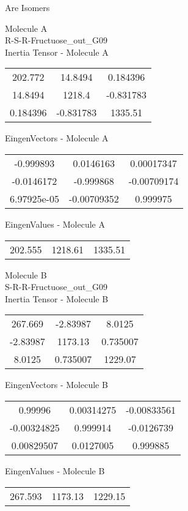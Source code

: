 \begin{center}
\vtab
\vtab
\textcolor{NavyBlue}{\Large Are Isomers}
\end{center}
\newpage
\begin{multicols}{2}
\begin{center}
Molecule A \\ 
R-S-R-Fructuose\_out\_G09
\\
Inertia Tensor - Molecule A \\
\vtab
\begin{tabular}{|c c c|}
202.772	 & 	14.8494	 & 	0.184396	 \\
14.8494	 & 	1218.4	 & 	-0.831783	 \\
0.184396	 & 	-0.831783	 & 	1335.51
\end{tabular}

\vtab
 EingenVectors - Molecule A     \\
\vtab
\begin{tabular}{|c c c|}
-0.999893	 & 	0.0146163	 & 	0.00017347	 \\
-0.0146172	 & 	-0.999868	 & 	-0.00709174	 \\
6.97925e-05	 & 	-0.00709352	 & 	0.999975
\end{tabular}

\vtab
 EingenValues - Molecule A     \\
\vtab
\begin{tabular}{|c c c|}
202.555	 & 	1218.61	 & 	1335.51
\end{tabular}
\columnbreak

Molecule B \\ 
S-R-R-Fructuose\_out\_G09
\\
Inertia Tensor - Molecule B \\
\vtab
\begin{tabular}{|c c c|}
267.669	 & 	-2.83987	 & 	8.0125	 \\
-2.83987	 & 	1173.13	 & 	0.735007	 \\
8.0125	 & 	0.735007	 & 	1229.07
\end{tabular}

\vtab
 EingenVectors - Molecule B     \\
\vtab
\begin{tabular}{|c c c|}
0.99996	 & 	0.00314275	 & 	-0.00833561	 \\
-0.00324825	 & 	0.999914	 & 	-0.0126739	 \\
0.00829507	 & 	0.0127005	 & 	0.999885
\end{tabular}

\vtab
 EingenValues - Molecule B     \\
\vtab
\begin{tabular}{|c c c|}
267.593	 & 	1173.13	 & 	1229.15
\end{tabular}

\end{center}
\end{multicols}
